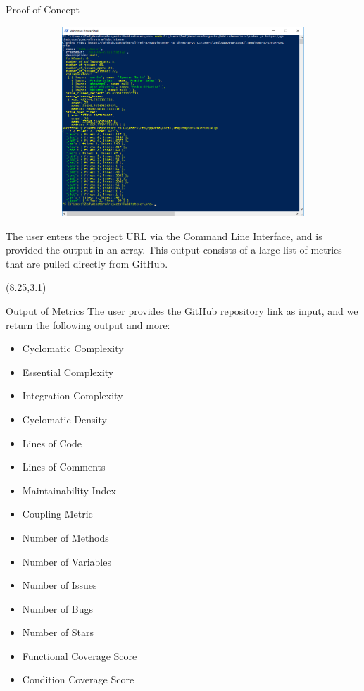 \documentclass[22pt]{beamer}
\begin{document}
\begin{frame}[fragile]
\begin{textblock}{7.25}
\begin{block}{Proof of Concept}
\begin{figure}
  \begin{subfigure}{0.96\textwidth}
    \centering
     \includegraphics[width=39cm]{PowerShellPOC.png} 
  \end{subfigure}
\end{figure}
The user enters the project URL via the Command Line Interface, and is provided the output in an array. This output consists of a large list of metrics that are pulled directly from GitHub.

\end{block}

\end{textblock}

\begin{textblock}{7.25}(8.25,3.1)
\begin{block}{Output of Metrics}
The user provides the GitHub repository link as input, and we return the following output and more:
\begin{itemize}
\item Cyclomatic Complexity 
\item Essential Complexity 
\item Integration Complexity 
\item Cyclomatic Density
\item Lines of Code 
\item Lines of Comments 
\item Maintainability Index 
\item Coupling Metric 
\item Number of Methods
\item Number of Variables 
\item Number of Issues 
\item Number of Bugs 
\item Number of Stars 
\item Functional Coverage Score
\item Condition Coverage Score 
\end{itemize}


\end{block}
\end{textblock}
\end{frame}
\end{document}
